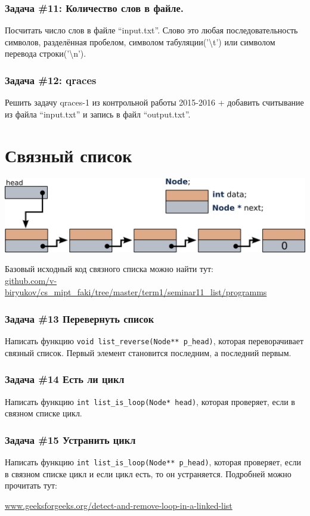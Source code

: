 \documentclass{article}
\begin{document}
\subsubsection*{\Squarepipe \quad Задача \#11: Количество слов в файле.}
Посчитать число слов в файле ``input.txt''. Слово это любая последовательность символов, разделённая пробелом, символом табуляции('\textbackslash t') или символом перевода строки('\textbackslash n').

\subsubsection*{\Bat \quad Задача \#12: qraces}
Решить задачу qraces-1 из контрольной работы 2015-2016 + добавить считывание из файла ``input.txt'' и запись в файл ``output.txt''.

\section*{Связный список}
\begin{center}
\includegraphics[width=0.6\linewidth]{list_initial.png}\\
\end{center}
Базовый исходный код связного списка можно найти тут:\\
\href{https://github.com/v-biryukov/cs_mipt_faki/tree/master/term1/seminar11_list/programms}{github.com/v-biryukov/cs\_mipt\_faki/tree/master/term1/seminar11\_list/programms}

\subsubsection*{\Squarepipe \quad Задача \#13 Перевернуть список}
Написать функцию \texttt{void list\_reverse(Node** p\_head)}, которая переворачивает связный список. Первый элемент становится последним, а последний первым. 

\subsubsection*{\Bat \quad Задача \#14 Есть ли цикл}
Написать функцию \texttt{int list\_is\_loop(Node* head)}, которая проверяет, если в связном списке цикл.

\subsubsection*{\Bat \quad Задача \#15 Устранить цикл}
Написать функцию \texttt{int list\_is\_loop(Node** p\_head)}, которая проверяет, если в связном списке цикл и если цикл есть, то он устраняется. Подробней можно прочитать тут:

\href{http://www.geeksforgeeks.org/detect-and-remove-loop-in-a-linked-list/}{www.geeksforgeeks.org/detect-and-remove-loop-in-a-linked-list}
\end{document}
